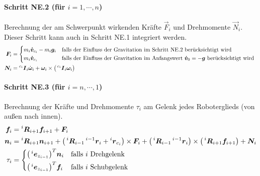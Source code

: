 			\paragraph{Schritt NE.2 (für \( i = 1, \cdots, n \))}
				Berechnung der am Schwerpunkt wirkenden Kräfte \( \vec{F}_i \) und Drehmomente \( \vec{N}_i \). Dieser Schritt kann auch in Schritt NE.1 integriert werden.
				\begin{align*}
					\vec{F}_i & =
					\begin{cases*}
						m_i \vec{\dot{v}}_{c_i} - m_i \vec{g}_i & falls der Einfluss der Gravitation im Schritt NE.2 berücksichtigt wird                                 \\
						m_i \vec{\dot{v}}_{c_i}                 & falls der Einfluss der Gravitation im Anfangswert \( \vec{\dot{v}}_0 = -\vec{g} \) berücksichtigt wird
					\end{cases*} \\
					\vec{N}_i & = \inreferenceto{c_i}{\mat{I}}_i \dot{\vec{\omega}}_i + \vec{\omega}_i \times \big( \inreferenceto{c_i}{\mat{I}}_i \vec{\omega}_i \big)
				\end{align*}

			\paragraph{Schritt NE.3 (für \( i = n, \cdots, 1 \))}
				Berechnung der Kräfte und Drehmomente \( \tau_i \) am Gelenk jedes Roboterglieds (von außen nach innen).
				\begin{align*}
					\vec{f}_i & = \inreferenceto{i}{\mat{R}}_{i + 1} \vec{f}_{i + 1} + \vec{F}_i                                                                                                                                                                                                                                                                                               \\
					\vec{n}_i & = \inreferenceto{i}{\mat{R}}_{i + 1} \vec{n}_{i + 1} + \big( \inreferenceto{i}{\mat{R}}_{i - 1} \inreferenceto{i - 1}{\vec{r}}_i + \inreferenceto{i}{\vec{r}}_{c_i} \big) \times \vec{F}_i + \big( \inreferenceto{i}{\mat{R}}_{i - 1} \inreferenceto{i - 1}{\vec{r}}_i \big) \times \big( \inreferenceto{i}{\mat{R}}_{i + 1} \vec{f}_{i + 1} \big) + \vec{N}_i \\
					\tau_i    & =
					\begin{cases*}
						\big( \inreferenceto{i}{\vec{e}}_{z_{i - 1}} \big)^T \vec{n}_i & falls \(i\) Drehgelenk  \\
						\big( \inreferenceto{i}{\vec{e}}_{z_{i - 1}} \big)^T \vec{f}_i & falls \(i\) Schubgelenk
					\end{cases*}
				\end{align*}


